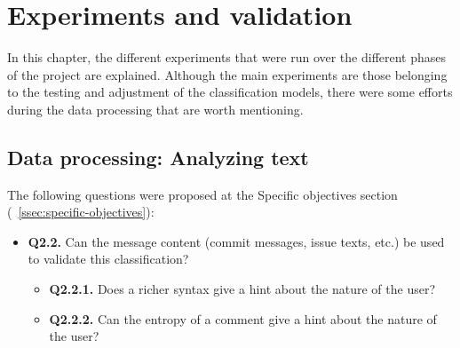 \documentclass[a4paper, 12pt]{book}
\begin{document}


\cleardoublepage


\chapter{Experiments and validation}
\label{chap:experiments}

In this chapter, the different experiments that were run over the different phases of the project are explained. Although the main experiments are those belonging to the testing and adjustment of the classification models, there were some efforts during the data processing that are worth mentioning.

\section{Data processing: Analyzing text}
\label{sec:exp-text-richness}

The following questions were proposed at the Specific objectives section (~\ref{ssec:specific-objectives}): 
\begin{itemize}
    \item \textbf{Q2.2.} Can the message content (commit messages, issue texts, etc.) be used to validate this classification?
    \begin{itemize}
        \item \textbf{Q2.2.1.} Does a richer syntax give a hint about the nature of the user? 
        \item \textbf{Q2.2.2.} Can the entropy of a comment give a hint about the nature of the user?
    \end{itemize}
\end{itemize}
\end{document}
